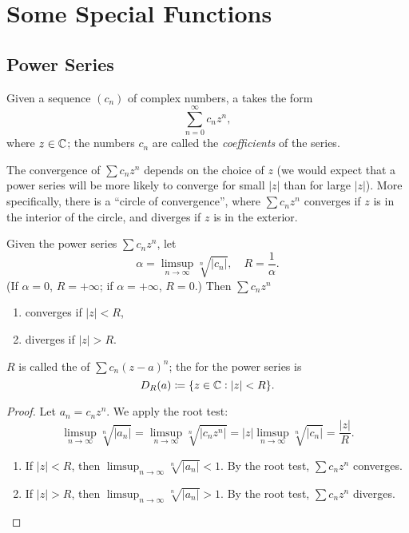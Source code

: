 \chapter{Some Special Functions}\label{chap:special-functions}
\section{Power Series}
\begin{definition}
Given a sequence $(c_n)$ of complex numbers, a  takes the form
\[\sum_{n=0}^{\infty}c_nz^n,\]
where $z\in\mathbb C$; the numbers $c_n$ are called the \emph{coefficients} of the series.
\end{definition}

The convergence of $\sum c_nz^n$ depends on the choice of $z$ (we would expect that a power series will be more likely to converge for small $|z|$ than for large $|z|$). More specifically, there is a ``circle of convergence'', where $\sum c_nz^n$ converges if $z$ is in the interior of the circle, and diverges if $z$ is in the exterior.

\begin{lemma}
Given the power series $\sum c_nz^n$, let
\[\alpha=\limsup_{n\to\infty}\sqrt[n]{|c_n|},\quad R=\frac{1}{\alpha}.\]
(If $\alpha=0$, $R=+\infty$; if $\alpha=+\infty$, $R=0$.) Then $\sum c_nz^n$
\begin{enumerate}[label=(\roman*)]
\item converges if $|z|<R$,
\item diverges if $|z|>R$.
\end{enumerate}
\end{lemma}

$R$ is called the  of $\sum c_n(z-a)^n$; the  for the power series is
\[D_R(a)\coloneqq\{z\in\mathbb C:|z|<R\}.\]

\begin{proof}
Let $a_n=c_nz^n$. We apply the root test:
\[\limsup_{n\to\infty}\sqrt[n]{|a_n|}=\limsup_{n\to\infty}\sqrt[n]{|c_nz^n|}=|z|\limsup_{n\to\infty}\sqrt[n]{|c_n|}=\frac{|z|}{R}.\]
\begin{enumerate}[label=(\roman*)]
\item If $|z|<R$, then $\displaystyle\limsup_{n\to\infty}\sqrt[n]{|a_n|}<1$. By the root test, $\sum c_nz^n$ converges.
\item If $|z|>R$, then $\displaystyle\limsup_{n\to\infty}\sqrt[n]{|a_n|}>1$. By the root test, $\sum c_nz^n$ diverges.
\end{enumerate}
\end{proof}

